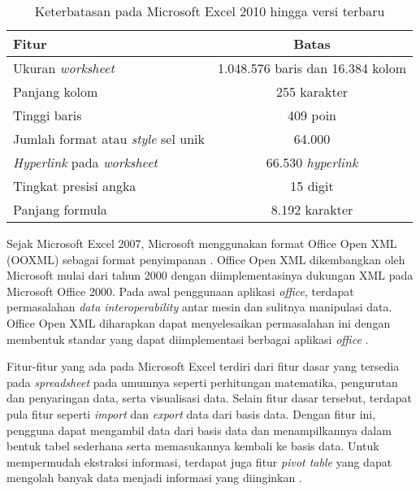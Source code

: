     \begin{table}[htb]
        \caption{Keterbatasan pada Microsoft Excel 2010 hingga versi terbaru}
        \label{KeterbatasanExcel}
        \begin{center}
            \begin{tabular}{ | l | c | }
                \hline
                Fitur & Batas \\ \hline
                Ukuran \textit{worksheet} & 1.048.576 baris dan 16.384 kolom \\
                Panjang kolom & 255 karakter \\
                Tinggi baris & 409 poin \\
                Jumlah format atau \textit{style} sel unik & 64.000 \\
                \textit{Hyperlink} pada \textit{worksheet} & 66.530 \textit{hyperlink} \\
                Tingkat presisi angka & 15 digit \\
                Panjang formula & 8.192 karakter \\
                \hline
            \end{tabular}
        \end{center}
    \end{table}

    Sejak Microsoft Excel 2007, Microsoft menggunakan format Office Open XML (OOXML) sebagai format penyimpanan \parencite{MSExcelSupport}. Office Open XML dikembangkan oleh Microsoft mulai dari tahun 2000 dengan diimplementasinya dukungan XML pada Microsoft Office 2000. Pada awal penggunaan aplikasi \textit{office}, terdapat permasalahan \textit{data interoperability} antar mesin dan sulitnya manipulasi data. Office Open XML diharapkan dapat menyelesaikan permasalahan ini dengan membentuk standar yang dapat diimplementasi berbagai aplikasi \textit{office} \parencite{OOXMLFormat}.

    Fitur-fitur yang ada pada Microsoft Excel terdiri dari fitur dasar yang tersedia pada \textit{spreadsheet} pada umumnya seperti perhitungan matematika, pengurutan dan penyaringan data, serta visualisasi data. Selain fitur dasar tersebut, terdapat pula fitur seperti \textit{import} dan \textit{export} data dari basis data. Dengan fitur ini, pengguna dapat mengambil data dari basis data dan menampilkannya dalam bentuk tabel sederhana serta memasukannya kembali ke basis data. Untuk mempermudah ekstraksi informasi, terdapat juga fitur \textit{pivot table} yang dapat mengolah banyak data menjadi informasi yang diinginkan \parencite{MSExcelSupport}. 

